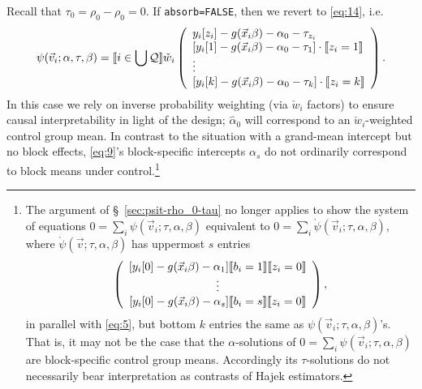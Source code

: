 \documentclass{article}
\DeclarePairedDelimiter{\indicator}{\llbracket}{\rrbracket}
\newcommand{\owt}[1][{[z_{i}]}]{\ensuremath{\check{w}_{i#1}}}
\begin{document}
Recall that $\tau_{0} = \rho_{0}-\rho_{0}=0$.  If \texttt{absorb=FALSE}, then we revert to \eqref{eq:14}, i.e.
\begin{equation*}
         \psi(\vec{v}_{i};
  \alpha, \tau, \beta) = \indicator{i \in \bigcup \mathcal{Q}}\owt[]
         \left( \begin{array}{l}
           y_{i}[z_{i}] - g(\vec{x}_{i}\beta)-
                  \alpha_0 - \tau_{z_{i}}\\
           {}[y_{i}[1] - g(\vec{x}_{i}\beta)-
                  \alpha_0-\tau_{1}]\cdot \indicator{z_{i}=1}\\
                  \vdots \\
           {}[y_{i}[k] - g(\vec{x}_{i}\beta)-
                 \alpha_0 - \tau_{k}]\cdot \indicator{z_{i}=k}\\%
                \end{array}\right).
\end{equation*}
In this case we rely on inverse probability weighting (via $\owt[]$ factors) to ensure causal interpretability in light of the design;  $\hat{\alpha}_0$ will correspond to an $\owt[]$-weighted control group mean. In contrast to the situation with a grand-mean intercept but no block effects, \eqref{eq:9}'s block-specific intercepts $\alpha_s$ do not ordinarily correspond to block means under control.\footnote{%
The argument of \S~\ref{sec:psit-rho_0-tau} no longer applies
to show the system of equations
$0=\sum_{i}\psi(\vec{v}_{i}; \tau, \alpha, \beta)$
equivalent to $0=\sum_{i}\grave{\psi}(\vec{v}_{i}; \tau,
\alpha, \beta)$, where $\grave{\psi}(\vec{v}; \tau,
\alpha, \beta)$ has uppermost $s$ entries
\begin{equation*}
    \left(
    \begin{array}{c}
           [y_{i}[0] - g(\vec{x}_{i}\beta)-
                  \alpha_{1} ]\indicator{b_{i}=1} \indicator{z_{i}=0}\\
      \vdots\\ 
          {} [y_{i}[0] - g(\vec{x}_{i}\beta)-
                  \alpha_{s}]\indicator{b_{i}=s} \indicator{z_{i}=0}\\      
    \end{array}
    \right),
  \end{equation*}
in parallel with \eqref{eq:5}, but bottom $k$ entries the same as ${\psi}(\vec{v}_{i}; \tau,
\alpha, \beta)$'s. That is, it may not be the case that the $\alpha$-solutions of
$0=\sum_{i}\psi(\vec{v}_{i}; \tau, \alpha, \beta)$ are
block-specific control group means.  Accordingly its $\tau$-solutions
do not necessarily bear interpretation as contrasts of Hajek estimators.
}
\end{document}
